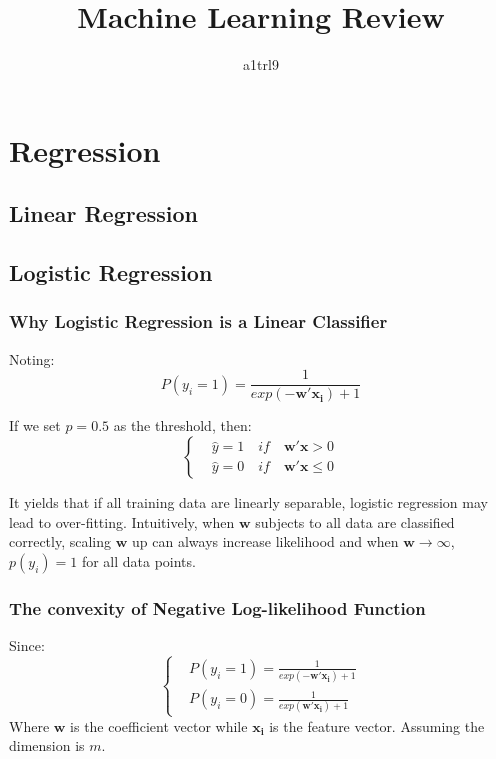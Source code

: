 \documentclass{article}
\author{a1trl9}
\title{Machine Learning Review}
\date{}
\newcommand{\V}[1]{\boldsymbol{#1}}
\begin{document}
\maketitle
\section{Regression}
\subsection{Linear Regression}
\subsection{Logistic Regression}
\subsubsection{Why Logistic Regression is a Linear Classifier}

Noting:
\begin{equation}
P(y_i=1)=\frac{1}{exp(-\V{w'}\V{x_i})+1}
\end{equation}

If we set \(p=0.5\) as the threshold, then:
\begin{equation}
\left\{
\begin{aligned}
&\hat{y}=1 \quad if \quad \V{w'}\V{x}>0\\
&\hat{y}=0 \quad if \quad \V{w'}\V{x}\leq0
\end{aligned}
\right.
\end{equation}

It yields that if all training data are linearly separable, logistic regression
may lead to over-fitting. Intuitively, when \(\V{w}\) subjects to all data are
classified correctly, scaling \(\V{w}\) up can always increase likelihood and when
\(\V{w} \to \infty\), \(p(y_i)=1\) for all data points.

\subsubsection{The convexity of Negative Log-likelihood Function}

Since:
\begin{equation}
\left\{
\begin{aligned}
&P(y_i=1)=\frac{1}{exp(-\V{w'}\V{x_i})+1}\\
&P(y_i=0)=\frac{1}{exp(\V{w'}\V{x_i})+1}
\end{aligned}
\right.
\end{equation}
Where \(\V{w}\) is the coefficient vector while \(\V{x_i}\) is the feature vector.
Assuming the dimension is \(m\).
\end{document}
